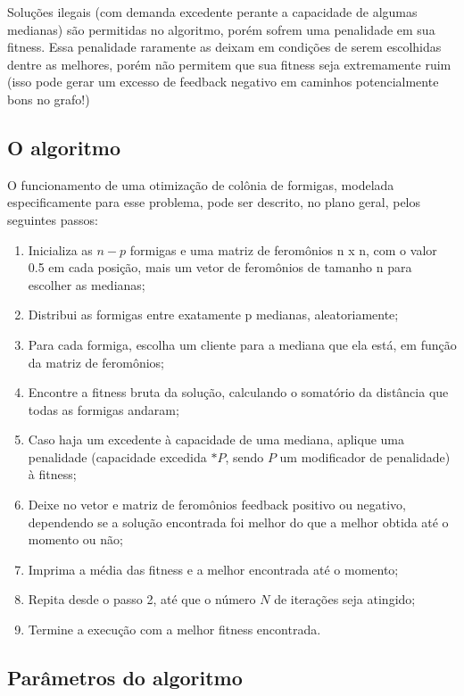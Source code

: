 \documentclass[11pt]{article}
\begin{document}
Soluções ilegais (com demanda excedente perante a capacidade de algumas medianas) são permitidas no algoritmo, porém sofrem uma penalidade em sua fitness. Essa penalidade raramente as deixam em condições de serem escolhidas dentre as melhores, porém não permitem que sua fitness seja extremamente ruim (isso pode gerar um excesso de feedback negativo em caminhos potencialmente bons no grafo!)

\subsection{O algoritmo}

O funcionamento de uma otimização de colônia de formigas, modelada especificamente para esse problema, pode ser descrito, no plano geral, pelos seguintes passos:

\begin{enumerate}
	\item Inicializa as $n - p$ formigas e uma matriz de feromônios n x n, com o valor 0.5 em cada posição, mais um vetor de feromônios de tamanho n para escolher as medianas;
	\item Distribui as formigas entre exatamente p medianas, aleatoriamente;
	\item Para cada formiga, escolha um cliente para a mediana que ela está, em função da matriz de feromônios;
	\item Encontre a fitness bruta da solução, calculando o somatório da distância que todas as formigas andaram;
	\item Caso haja um excedente à capacidade de uma mediana, aplique uma penalidade (capacidade excedida $* P$, sendo $P$ um modificador de penalidade) à fitness;
	\item Deixe no vetor e matriz de feromônios feedback positivo ou negativo, dependendo se a solução encontrada foi melhor do que a melhor obtida até o momento ou não;
	\item Imprima a média das fitness e a melhor encontrada até o momento;
	\item Repita desde o passo 2, até que o número $N$ de iterações seja atingido;
	\item Termine a execução com a melhor fitness encontrada.
\end{enumerate}

\subsection{Parâmetros do algoritmo}
\end{document}

